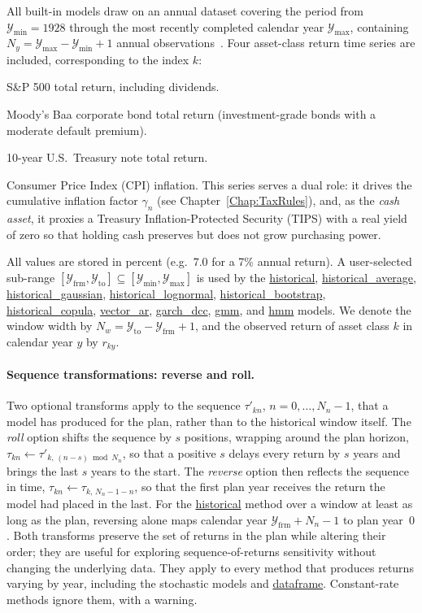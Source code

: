 \documentclass[fleqn,12pt]{report}
\newcommand{\code}[1]{\url{#1}}
\begin{document}
All built-in models draw on an annual dataset covering the period from
$\mathcal{Y}_{\min} = 1928$ through the most recently completed calendar year
$\mathcal{Y}_{\max}$, containing $N_y = \mathcal{Y}_{\max} - \mathcal{Y}_{\min} + 1$
annual observations~\cite{shiller2000}.
Four asset-class return time series are included, corresponding to the index $k$:
\begin{description}[leftmargin=4em,style=multiline]
\item [$k=0$]
    S\&P 500 total return, including dividends.
\item [$k=1$]
    Moody's Baa corporate bond total return (investment-grade
    bonds with a moderate default premium).
\item [$k=2$]
    10-year U.S.\ Treasury note total return.
\item [$k=3$]
    Consumer Price Index (CPI) inflation.
    This series serves a dual role: it drives the cumulative inflation
    factor $\gamma_n$ (see Chapter~\ref{Chap:TaxRules}), and, as the {\em cash asset},
    it proxies a Treasury Inflation-Protected Security (TIPS) with a real
    yield of zero so that holding cash preserves but does not grow purchasing
    power.
\end{description}
All values are stored in percent (e.g.\ $7.0$ for a 7\% annual return).
A user-selected sub-range $[\mathcal{Y}_{\mathrm{frm}},\mathcal{Y}_{\mathrm{to}}]
\subseteq [\mathcal{Y}_{\min}, \mathcal{Y}_{\max}]$ is used
by the \code{historical}, \code{historical_average}, \code{historical_gaussian},
\code{historical_lognormal}, \code{historical_bootstrap}, \code{historical_copula},
\code{vector_ar}, \code{garch_dcc}, \code{gmm}, and \code{hmm} models.
We denote the window width by $N_w = \mathcal{Y}_{\mathrm{to}} -
\mathcal{Y}_{\mathrm{frm}} + 1$, and the observed return of asset class $k$ in
calendar year $y$ by $r_{ky}$.

\paragraph*{Sequence transformations: reverse and roll.}
Two optional transforms apply to the sequence $\tau'_{kn}$, $n = 0,\ldots,N_n-1$, that a
model has produced for the plan, rather than to the historical window itself.
The {\em roll} option shifts the sequence by $s$ positions, wrapping around the plan horizon,
$\tau_{kn} \leftarrow \tau'_{k,\,(n-s) \bmod N_n}$,
so that a positive $s$ delays every return by $s$ years and brings the last $s$ years to the
start.
The {\em reverse} option then reflects the sequence in time,
$\tau_{kn} \leftarrow \tau_{k,\,N_n-1-n}$,
so that the first plan year receives the return the model had placed in the last.
For the \code{historical} method over a window at least as long as the plan, reversing alone
maps calendar year $\mathcal{Y}_{\mathrm{frm}}+N_n-1$ to plan year~$0$.
Both transforms preserve the set of returns in the plan while altering their
order; they are useful for exploring sequence-of-returns sensitivity without
changing the underlying data.
They apply to every method that produces returns varying by year, including the
stochastic models and \code{dataframe}.
Constant-rate methods ignore them, with a warning.
\end{document}
